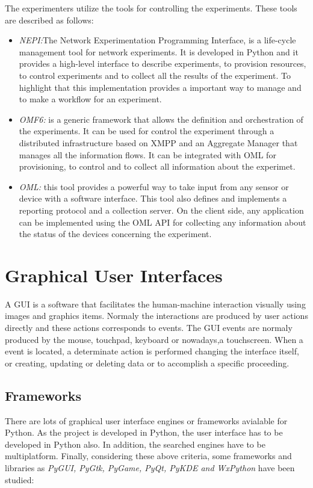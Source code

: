 The experimenters utilize the tools for controlling the experiments. These tools
are described as follows:
\begin{itemize}
\item \emph{NEPI:}The Network Experimentation Programming Interface, is a
  life-cycle management tool for network experiments. It is developed in Python
  and it provides a high-level interface to describe experiments, to provision
  resources, to control experiments and to collect all the results of the
  experiment. To highlight that this implementation provides a important way to
  manage and to make a workflow for an experiment.
\item \emph{OMF6:} is a generic framework that allows the definition and
  orchestration of the experiments. It can be used for control the experiment
  through a distributed infrastructure based on XMPP and an Aggregate Manager
  that manages all the information flows. It can be integrated with OML for
  provisioning, to control and to collect all information about the experimet.
\item \emph{OML:} this tool provides a powerful way to take input from any
  sensor or device with a software interface. This tool also defines and
  implements a reporting protocol and a collection server. On the client side,
  any application can be implemented using the OML API for collecting any
  information about the status of the devices concerning the experiment. 
\end{itemize}


\section{Graphical User Interfaces}

A \ac{GUI} is a software that facilitates the human-machine interaction
visually using images and graphics items. Normaly the interactions are produced
by user actions directly and these actions corresponds to events. The GUI events
are normaly produced by the mouse, touchpad, keyboard or nowadays,a
touchscreen. When a event is located, a determinate action is performed
changing the interface itself, or creating, updating or deleting data or to
accomplish a specific proceeding. 


\subsection{Frameworks}

There are lots of graphical user interface engines or frameworks avialable for
Python. As the project is developed in Python, the user interface has to be
developed in Python also. In addition, the searched engines have to be
multiplatform. Finally, considering these above criteria, some frameworks and
libraries  as \emph{PyGUI, PyGtk, PyGame, PyQt, PyKDE and WxPython} have been studied:


